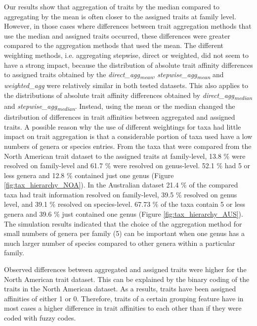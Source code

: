 \documentclass{article}
\begin{document}
Our results show that aggregation of traits by the median compared to aggregating by the mean is often closer to the assigned traits at family level. However, in those cases where differences between trait aggregation methods that use the median and assigned traits occurred, these differences were greater compared to the aggregation methods that used the mean. The different weighting methods, i.e. aggregating stepwise, direct or weighted, did not seem to have a strong impact, because the distribution of absolute trait affinity differences to assigned traits obtained by the \textit{direct\_agg\textsubscript{mean}}, \textit{stepwise\_agg\textsubscript{mean}} and \textit{weighted\_agg} were relatively similar in both tested datasets. This also applies to the distributions of absolute trait affinity differences obtained by \textit{direct\_agg\textsubscript{median}} and \textit{stepwise\_agg\textsubscript{median}}. Instead, using the mean or the median changed the distribution of differences in trait affinities between aggregated and assigned traits. A possible reason why the use of different weightings for taxa had little impact on trait aggregation is that a considerable portion of taxa used have a low numbers of genera or species entries. From the taxa that were compared from the North American trait dataset to the assigned traits at family-level, 13.8 \% were resolved on family-level and 61.7 \% were resolved on genus-level. 52.1 \% had 5 or less genera and 12.8 \% contained just one genus (Figure \ref{fig:tax_hierarchy_NOA}). In the Australian dataset 21.4 \% of the compared taxa had trait information resolved on family-level, 39.5 \% resolved on genus level, and 39.1 \% resolved on species-level. 67.73 \% of the taxa contain 5 or less genera and 39.6 \% just contained one genus (Figure \ref{fig:tax_hierarchy_AUS}). The simulation results indicated that the choice of the aggregation method for small numbers of genera per family (5) can be important when one genus has a much larger number of species compared to other genera within a particular family. %

Observed differences between aggregated and assigned traits were higher for the North American trait dataset. This can be explained by the binary coding of the traits in the North American dataset. As a results, traits have been assigned affinities of either 1 or 0.  Therefore, traits of a certain grouping feature have in most cases a higher difference in trait affinities to each other than if they were coded with fuzzy codes.
\end{document}
